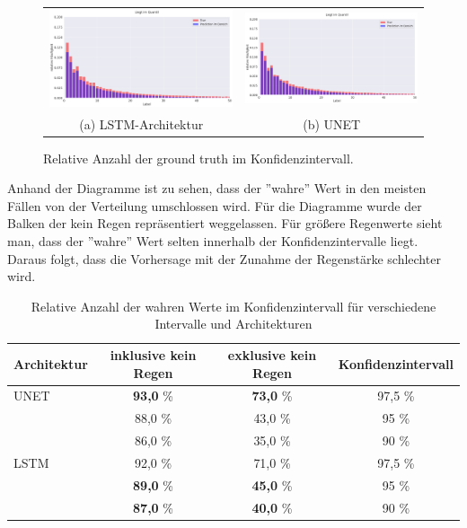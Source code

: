 \begin{figure}[h]
\centering
\begin{tabular}{cc}
\includegraphics[width=80mm]{abb/dist_LSTM.png}&
\includegraphics[width=80mm]{abb/dist_UNET.png}\\
(a) \small{LSTM-Architektur} & (b) \small{UNET}
\end{tabular}
\caption{Relative Anzahl der ground truth im Konfidenzintervall. \label{fig:dist}}
\end{figure}

\noindent Anhand der Diagramme ist zu sehen, dass der ''wahre'' Wert in den meisten Fällen von der Verteilung umschlossen wird. Für die Diagramme wurde der Balken der kein Regen repräsentiert weggelassen. Für größere Regenwerte sieht man, dass der ''wahre'' Wert selten innerhalb der Konfidenzintervalle liegt. Daraus folgt, dass die Vorhersage mit der Zunahme der Regenstärke schlechter wird.\\



\begin{table}[h]
\centering
\begin{tabular}[h]{l|c|c|c}
Architektur & inklusive kein Regen & exklusive kein Regen & Konfidenzintervall \\
\hline
UNET & \textbf{93,0} \% & \textbf{73,0} \%  & 97,5 \%\\
 & 88,0 \% & 43,0 \% & 95 \% \\
 & 86,0 \% & 35,0 \% & 90 \% \\
 \hline
LSTM &92,0 \% & 71,0 \% & 97,5 \% \\
 &\textbf{89,0} \% & \textbf{45,0} \% & 95 \% \\
 &\textbf{87,0} \% & \textbf{40,0} \% & 90 \% \\

\end{tabular}
\caption{ Relative Anzahl der wahren Werte im Konfidenzintervall für verschiedene Intervalle und Architekturen\label{tab:konv}}
\end{table}

